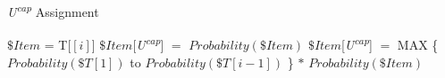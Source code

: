 


%
  \begin{algorithm}
   \caption{\emph{U\textsuperscript{cap}} Assignment}
    \begin{algorithmic}[1]
					\State $\$Item$ = T[$[i]$]
						\State $\$Item$[\emph{U\textsuperscript{cap}}] $=$ $Probability(\$Item)$
					\Else
						\State $\$Item$[\emph{U\textsuperscript{cap}}] $=$ MAX \{ $Probability(\$T[1])$ to $Probability(\$T[i-1])$ \} $*$ $Probability(\$Item)$
					\EndIf
				\EndFor
			\EndFor
       \EndFunction

\end{algorithmic}
\end{algorithm}
%
